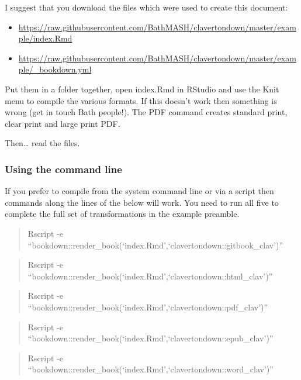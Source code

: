 \documentclass[
  10pt,
  a4paper]{article}
\providecommand{\tightlist}{%
  \setlength{\itemsep}{0pt}\setlength{\parskip}{0pt}}
\theoremstyle{plain}
\theoremstyle{definition}
\theoremstyle{plain}
\theoremstyle{plain}
\theoremstyle{plain}
\theoremstyle{plain}
\theoremstyle{definition}
\theoremstyle{definition}
\theoremstyle{remark}
\theoremstyle{remark}
\begin{document}
I suggest that you download the files which were used to create this document:

\begin{itemize}
\tightlist
\item
  \url{https://raw.githubusercontent.com/BathMASH/clavertondown/master/example/index.Rmd}
\item
  \url{https://raw.githubusercontent.com/BathMASH/clavertondown/master/example/_bookdown.yml}
\end{itemize}

Put them in a folder together, open index.Rmd in RStudio and use the Knit menu to compile the various formats. If this doesn't work then something is wrong (get in touch Bath people!). The PDF command creates standard print, clear print and large print PDF.

Then\ldots{} read the files.

\hypertarget{using-the-command-line}{%
\subsubsection{Using the command line}\label{using-the-command-line}}

If you prefer to compile from the system command line or via a script then commands along the lines of the below will work. You need to run all five to complete the full set of transformations in the example preamble.

\begin{quote}
Rscript -e ``bookdown::render\_book(`index.Rmd',`clavertondown::gitbook\_clav')''
\end{quote}

\begin{quote}
Rscript -e ``bookdown::render\_book(`index.Rmd',`clavertondown::html\_clav')''
\end{quote}

\begin{quote}
Rscript -e ``bookdown::render\_book(`index.Rmd',`clavertondown::pdf\_clav')''
\end{quote}

\begin{quote}
Rscript -e ``bookdown::render\_book(`index.Rmd',`clavertondown::epub\_clav')''
\end{quote}

\begin{quote}
Rscript -e ``bookdown::render\_book(`index.Rmd',`clavertondown::word\_clav')''
\end{quote}
\end{document}
